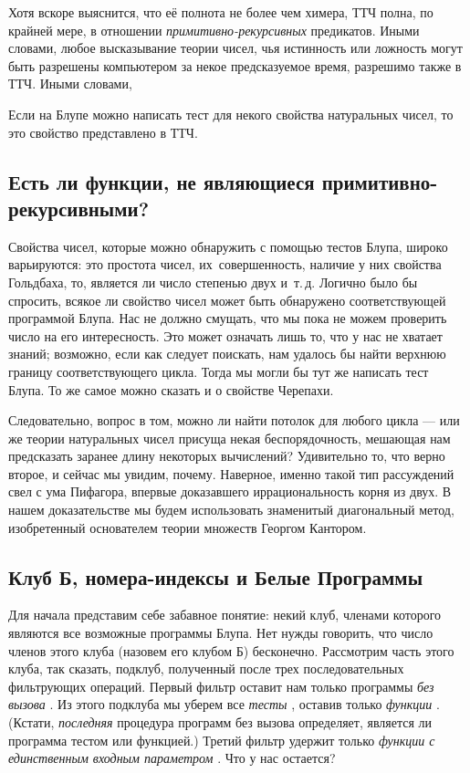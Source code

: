 \documentclass[../main.tex]{subfiles}
\begin{document}
Хотя вскоре выяснится, что её полнота не более чем химера, ТТЧ полна, по крайней мере, в отношении \emph{примитивно-рекурсивных} предикатов. Иными словами, любое высказывание теории чисел, чья истинность или ложность могут быть разрешены компьютером за некое предсказуемое время, разрешимо также в ТТЧ\@. Иными словами,

Если на Блупе можно написать тест для некого свойства натуральных чисел, то это свойство представлено в ТТЧ.


\subsection{Есть ли функции, не являющиеся примитивно-рекурсивными?}

Свойства чисел, которые можно обнаружить с помощью тестов Блупа, широко варьируются: это простота чисел, их~совершенность, наличие у них свойства Гольдбаха, то, является ли число степенью двух и~т.\,д. Логично было бы спросить, всякое ли свойство чисел может быть обнаружено соответствующей программой Блупа. Нас не должно смущать, что мы пока не можем проверить число на его интересность. Это может означать лишь то, что у нас не хватает знаний; возможно, если как следует поискать, нам удалось бы найти верхнюю границу соответствующего цикла. Тогда мы могли бы тут же написать тест Блупа. То же самое можно сказать и о свойстве Черепахи.

Следовательно, вопрос в том, можно ли найти потолок для любого цикла --- или же теории натуральных чисел присуща некая беспорядочность, мешающая нам предсказать заранее длину некоторых вычислений? Удивительно то, что верно второе, и сейчас мы увидим, почему. Наверное, именно такой тип рассуждений свел с ума Пифагора, впервые доказавшего иррациональность корня из двух. В нашем доказательстве мы будем использовать знаменитый диагональный метод, изобретенный основателем теории множеств Георгом Кантором.


\subsection{Клуб Б, номера-индексы и Белые Программы}

Для начала представим себе забавное понятие: некий клуб, членами которого являются все возможные программы Блупа. Нет нужды говорить, что число членов этого клуба (назовем его клубом Б) бесконечно. Рассмотрим часть этого клуба, так сказать, подклуб, полученный после трех последовательных фильтрующих операций. Первый фильтр оставит нам только программы \emph{без вызова} . Из этого подклуба мы уберем все \emph{тесты} , оставив только \emph{функции} . (Кстати, \emph{последняя} процедура программ без вызова определяет, является ли программа тестом или функцией.) Третий фильтр удержит только \emph{функции с единственным входным параметром} . Что у нас остается?
\end{document}
